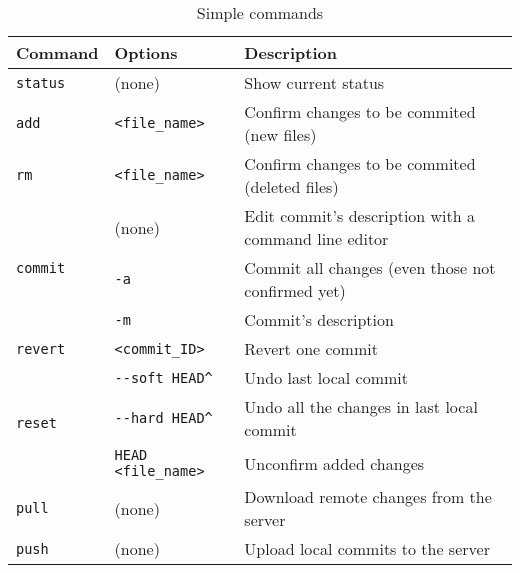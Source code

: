 \documentclass[a4paper,10pt]{article}
\begin{document}
\begin{table}
\caption{Simple commands}
\centering
\begin{tabular}{l l l}
\hline\hline
Command & Options & Description \\
\hline\hline
\multirow{1}{*}{\texttt{status}} & (none) & Show current status \\ \hline
\multirow{1}{*}{\texttt{add}} & \texttt{<file\_name>} & Confirm changes to be commited (new files) \\ \hline
\multirow{1}{*}{\texttt{rm}} & \texttt{<file\_name>} & Confirm changes to be commited (deleted files) \\ \hline
\multirow{3}{*}{\texttt{commit}} & (none) & Edit commit's description with a command line editor \\
& \texttt{-a} & Commit all changes (even those not confirmed yet) \\
& \texttt{-m} & Commit's description \\ \hline
\multirow{1}{*}{\texttt{revert}} & \texttt{<commit\_ID>} & Revert one commit \\ \hline
\multirow{3}{*}{\texttt{reset}} & \texttt{-{}-soft HEAD\^} & Undo last local commit  \\
& \texttt{-{}-hard HEAD\^} & Undo all the changes in last local commit \\
& \texttt{HEAD <file\_name>} & Unconfirm added changes \\ \hline
\multirow{1}{*}{\texttt{pull}} & (none) & Download remote changes from the server  \\ \hline
\multirow{1}{*}{\texttt{push}} & (none) & Upload local commits to the server  \\ \hline
\hline
\end{tabular}
\end{table}
\end{document}
